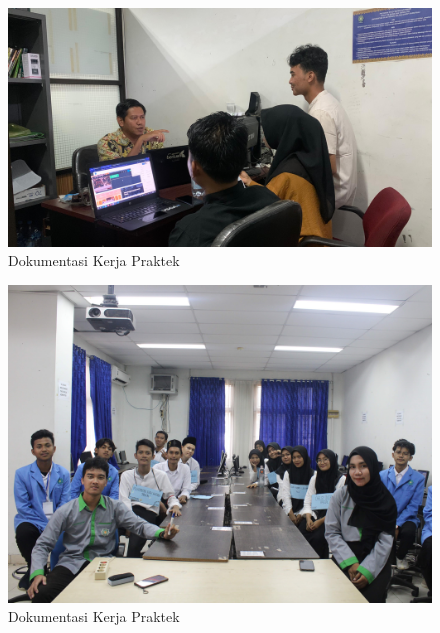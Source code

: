 \begin{figure}
    \centering
    \includegraphics[width=1\linewidth]{konten//gambar/Dokumentasi KP 3.jpg}
    \caption{Dokumentasi Kerja Praktek}
    \label{fig:enter-label}
\end{figure}
\begin{figure}
    \centering
    \includegraphics[width=1\linewidth]{konten//gambar/Dokumentasi KP 4.jpg}
    \caption{Dokumentasi Kerja Praktek}
    \label{fig:enter-label}
\end{figure}
